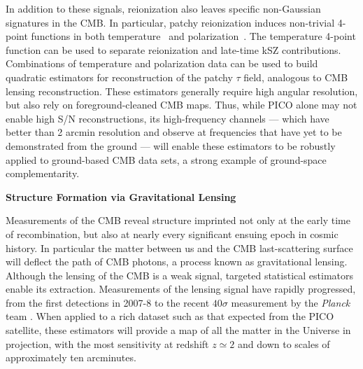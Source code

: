 \documentclass[PICOReport.tex]{subfiles}
\begin{document}
In addition to these signals, reionization also leaves specific non-Gaussian signatures in the CMB.  In particular, patchy reionization 
induces non-trivial 4-point functions in both temperature~\citep{SmithFerraro2017} and polarization~\citep{DvorkinSmith2008}.  The 
temperature 4-point function can be used to separate reionization and late-time kSZ contributions.  Combinations of temperature and 
polarization data can be used to build quadratic estimators for reconstruction of the patchy $\tau$ field, analogous to CMB lensing 
reconstruction.  These estimators generally require high angular resolution, but also rely on foreground-cleaned CMB maps.  Thus, 
while PICO alone may not enable high S/N reconstructions, its high-frequency channels --- which have better than 2 arcmin 
resolution and observe at frequencies that have yet to be demonstrated from the ground --- will enable these estimators to be 
robustly applied to ground-based CMB data sets, a strong example of ground-space complementarity.



{\bf Structure Formation via Gravitational Lensing}

Measurements of the CMB reveal structure imprinted not only at the early time of recombination, but also at nearly every significant ensuing epoch in cosmic history.  In particular the matter between us and the CMB last-scattering surface will deflect the path of CMB photons, a process known as gravitational lensing.  Although the lensing of the CMB is a weak signal, targeted statistical estimators enable its extraction.  Measurements of the lensing signal have rapidly progressed, from the first detections in 2007-8 \citep{2007PhRvD..76d3510S, 2008PhRvD..78d3520H} to the recent $40\sigma$ measurement by the {\it Planck} team \cite{2018arXiv180706210P}.  When applied to a rich dataset such as that expected from the PICO satellite, these estimators will provide a map of all the matter in the Universe in projection, with the most sensitivity at redshift $z \simeq 2$ and down to scales of approximately ten arcminutes.  
\end{document}
